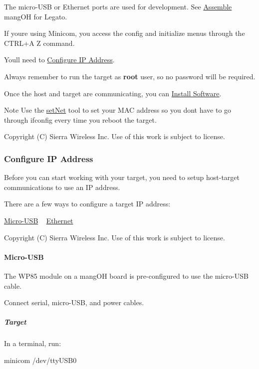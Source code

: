 The micro-\/\+U\+S\+B or Ethernet ports are used for development. See \hyperlink{getstartedMangOHAssemble}{Assemble} mang\+O\+H for Legato.

If you\textquotesingle{}re using Minicom, you access the config and initialize menus through the {\ttfamily C\+T\+R\+L+\+A} Z command.

You\textquotesingle{}ll need to \hyperlink{getstartedConfigIP}{Configure I\+P Address}.

Always remember to run the target as {\bfseries root} user, so no password will be required.

Once the host and target are communicating, you can \hyperlink{getstartedMangOHInstallSoftware}{Install Software}.

\begin{DoxyNote}{Note}
Use the \hyperlink{toolsTarget_setNet}{set\+Net} tool to set your M\+A\+C address so you don\textquotesingle{}t have to go through {\ttfamily ifconfig} every time you reboot the target.
\end{DoxyNote}




Copyright (C) Sierra Wireless Inc. Use of this work is subject to license. \hypertarget{getstartedConfigIP}{}\subsubsection{Configure I\+P Address}\label{getstartedConfigIP}
Before you can start working with your target, you need to setup host-\/target communications to use an I\+P address.

There are a few ways to configure a target I\+P address\+:

\hyperlink{getstartedConfigIPusb}{Micro-\/\+U\+S\+B} ~\newline
 \hyperlink{getstartedConfigIPeth}{Ethernet} 



Copyright (C) Sierra Wireless Inc. Use of this work is subject to license. \hypertarget{getstartedConfigIPusb}{}\paragraph{Micro-\/\+U\+S\+B}\label{getstartedConfigIPusb}
The W\+P85 module on a mang\+O\+H board is pre-\/configured to use the micro-\/\+U\+S\+B cable.

Connect serial, micro-\/\+U\+S\+B, and power cables.\hypertarget{getstarted_config_i_pusb_getstartedConfigIPusb_target}{}\subparagraph{Target}\label{getstarted_config_i_pusb_getstartedConfigIPusb_target}
In a terminal, run\+: 
\begin{DoxyCode}
minicom /dev/ttyUSB0 
\end{DoxyCode}


